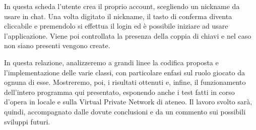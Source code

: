 In questa scheda l'utente crea il proprio account, scegliendo un nickname da usare in chat.
Una volta digitato il nickname, il tasto di conferma diventa cliccabile e premendolo si effettua
il login ed è possibile iniziare ad usare l'applicazione.
Viene poi controllata la presenza della coppia di chiavi e nel caso non siano presenti vengono create.

In questa relazione, analizzeremo a grandi linee la codifica proposta e l'implementazione
delle varie classi, con particolare enfasi sul ruolo giocato da ognuna di esse.
Mostreremo, poi, i risultati ottenuti e, infine,
il funzionamento dell'intero programma qui presentato,
esponendo anche i test fatti in corso d'opera
in locale e sulla Virtual Private Network di ateneo.
Il lavoro svolto sarà, quindi, accompagnato dalle dovute conclusioni e
da un commento sui possibili sviluppi futuri.